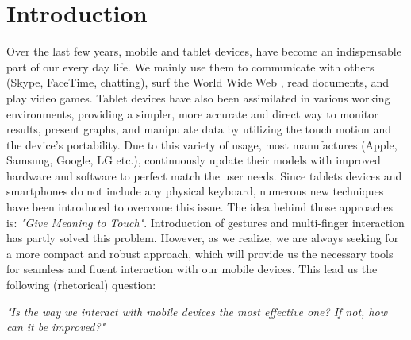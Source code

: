 \section{Introduction}
Over the last few years, mobile and tablet devices, have become an indispensable part of our every day life. 
We mainly use them to communicate with others (Skype, FaceTime, chatting), surf the World Wide Web \cite{www}, read documents, and play video games. 
Tablet devices have also been assimilated in various working environments, providing a simpler, more accurate and direct way to monitor results, present graphs, and manipulate data by utilizing the touch motion and the device's portability.
Due to this variety of usage, most manufactures (Apple, Samsung, Google, LG etc.), continuously update their models with improved hardware and software to perfect match the user needs.
Since tablets devices and smartphones do not include any physical keyboard, numerous new techniques have been introduced to overcome this issue. The idea behind those approaches is: \emph{"Give Meaning to Touch"}. Introduction of gestures and multi-finger interaction \cite{multiTouch} has partly solved this problem. However, as we realize, we are always seeking for a more compact and robust approach, which will provide us the necessary tools for seamless and fluent interaction with our mobile devices. This lead us the following (rhetorical) question:

\emph{"Is the way we interact with mobile devices the most effective one? If not, how can it be improved?"}

